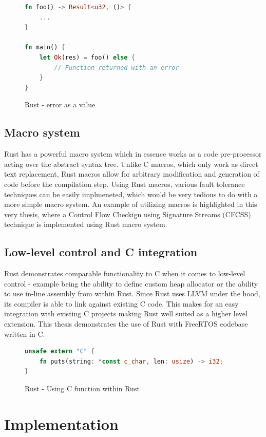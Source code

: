 \documentclass[12pt, letterpaper]{article}
\begin{document}
\begin{figure}
\begin{lstlisting}[language=Rust]
fn foo() -> Result<u32, ()> {
    ...
}

fn main() {
    let Ok(res) = foo() else {
        // Function returned with an error
    }
}
\end{lstlisting}
\caption{Rust - error as a value}
\label{fig:rust_error}
\end{figure}


\subsection{Macro system}
Rust has a powerful macro system which in essence works as a code pre-processor acting over the abstract syntax tree. Unlike C macros, which only work as direct text replacement, Rust macros allow for arbitrary modification and generation of code before the compilation step. Using Rust macros, various fault tolerance techniques can be easily implmeneted, which would be very tedious to do with a more simple macro system. An example of utilizing macros is highlighted in this very thesis, where a Control Flow Checkign using Signature Streams (CFCSS) technique is implemented using Rust macro system. 

\subsection{Low-level control and C integration}
Rust demonstrates comparable functionality to C when it comes to low-level control - example being the ability to define custom heap allocator or the ability to use in-line assembly from within Rust. Since Rust uses LLVM under the hood, its compiler is able to link against existing C code. This makes for an easy integration with existing C projects making Rust well suited as a higher level extension. This thesis demonstrates the use of Rust with FreeRTOS codebase written in C.

\begin{figure}
\begin{lstlisting}[language=Rust]
unsafe extern "C" {
    fn puts(string: *const c_char, len: usize) -> i32;
}
\end{lstlisting}
\caption{Rust - Using C function within Rust}
\label{fig:rust_extern}
\end{figure}

\newpage

\section{Implementation}
\end{document}
